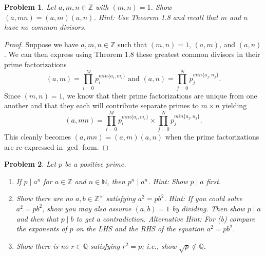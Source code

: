 \documentclass[12pt]{article}
\newtheorem{problem}{Problem}
\numberwithin{problem}{section} %
\theoremstyle{remark}  %
\newenvironment{answer}
    {\begin{adjustwidth}{0pt}{0pt}}
    {\end{adjustwidth}}
\begin{document}
\setcounter{problem}{23}
    \begin{problem}
        Let $a,m,n\in\mathbb{Z}$ with $(m,n)=1$. Show $(a,mn)=(a,m)(a,n)$. Hint: Use Theorem 1.8 and recall that $m$ and $n$ have no common divisors.
    \end{problem}
    \begin{answer}
        \begin{proof}
            Suppose we have $a,m,n\in\mathbb{Z}$ such that $(m,n)=1$, $(a,m)$, and $(a,n)$. We can then express using Theorem 1.8 these greatest common divisors in their prime factorizations $$(a,m)=\prod_{i=0}^{M}p_i^{min\{a_i,m_i\}}\text{ and }(a,n)=\prod_{j=0}^{N}p_j^{min\{a_j,n_j\}}.$$ Since $(m,n)=1$, we know that their prime factorizations are unique from one another and that they each will contribute separate primes to $m\times n$ yielding $$(a,mn)=\prod_{i=0}^{M}p_i^{min\{a_i,m_i\}}\times\prod_{j=0}^{N}p_j^{min\{a_j,n_j\}}.$$ This cleanly becomes $(a,mn)=(a,m)(a,n)$ when the prime factorizations are re-expressed in $\gcd$ form.
        \end{proof}
    \end{answer}
\vspace{5pt}
    \begin{problem}
        Let $p$ be a positive prime.
        \begin{enumerate}[label=(\alph*)]
            \item If $p\mid a^n$ for $a\in\mathbb{Z}$ and $n\in\mathbb{N}$, then $p^n\mid a^n$. Hint: Show $p\mid a$ first.
            \item Show there are no $a,b\in\mathbb{Z}^{\times}$ satisfying $a^2=pb^2$. Hint: If you could solve $a^2=pb^2$, show you may also assume $(a,b)=1$ by dividing. Then show $p\mid a$ and then that $p\mid b$ to get a contradiction. Alternative Hint: For (b) compare the exponents of $p$ on the LHS and the RHS of the equation $a^2=pb^2$.
            \item Show there is no $r\in\mathbb{Q}$ satisfying $r^2=p$; i.e., show $\sqrt{p}\notin\mathbb{Q}$.
        \end{enumerate}
    \end{problem}
\end{document}
